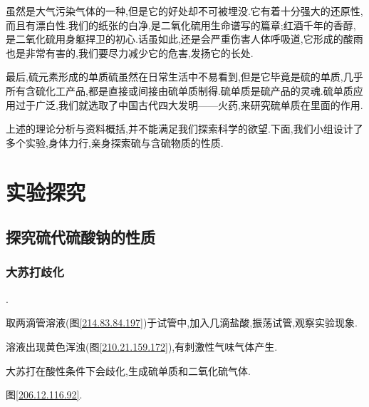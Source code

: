 \documentclass[hyperref,UTF8]{ctexart}
\begin{document}
虽然是大气污染气体的一种,但是它的好处却不可被埋没.它有着十分强大的还原性,而且有漂白性.我们的纸张的白净,是二氧化硫用生命谱写的篇章;红酒千年的香醇,是二氧化硫用身躯捍卫的初心.话虽如此,还是会严重伤害人体呼吸道,它形成的酸雨也是非常有害的,我们要尽力减少它的危害,发扬它的长处.

最后,硫元素形成的单质硫虽然在日常生活中不易看到,但是它毕竟是硫的单质,几乎所有含硫化工产品,都是直接或间接由硫单质制得.硫单质是硫产品的灵魂.硫单质应用过于广泛,我们就选取了中国古代四大发明——火药,来研究硫单质在里面的作用.

上述的理论分析与资料概括,并不能满足我们探索科学的欲望.下面,我们小组设计了多个实验,身体力行,亲身探索硫与含硫物质的性质.

\section{实验探究}
\subsection{探究硫代硫酸钠的性质}

\subsubsection{大苏打歧化}\label{252.130.196.242}

.

取两滴管溶液(图\ref{214.83.84.197})于试管中,加入几滴盐酸,振荡试管,观察实验现象.

溶液出现黄色浑浊(图\ref{210.21.159.172}),有刺激性气味气体产生.

大苏打在酸性条件下会歧化,生成硫单质和二氧化硫气体.

图\ref{206.12.116.92}.
\end{document}
